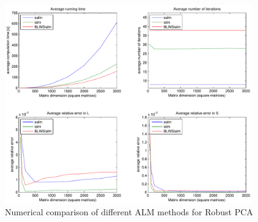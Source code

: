 %
\begin{figure}[h]
\centering
\includegraphics[width=0.95\textwidth]{../figures/ALM_comparison}
\caption{Numerical comparison of different ALM methods for Robust PCA}
\label{Algorithms:Discussion:NumComp:ALM:figure}
\end{figure}
%
%
%
%
%

